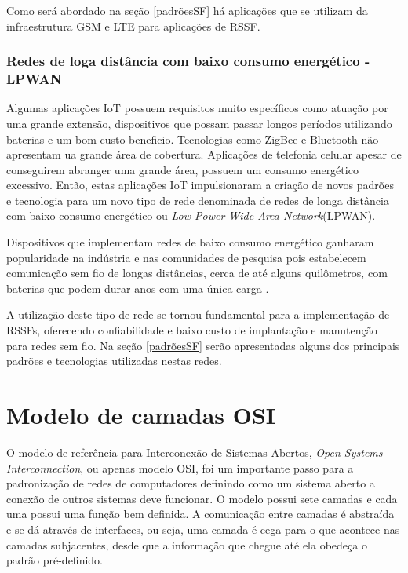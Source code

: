 Como será abordado na seção \ref{padrõesSF} há aplicações que se utilizam da infraestrutura GSM e LTE para aplicações de RSSF.


\subsubsection*{Redes de loga distância com baixo consumo energético - LPWAN}
Algumas aplicações IoT possuem requisitos muito específicos como atuação por uma grande extensão, dispositivos que possam passar longos períodos utilizando baterias e um bom custo beneficio. Tecnologias como ZigBee e Bluetooth não apresentam ua grande área de cobertura. Aplicações de telefonia celular apesar de conseguirem abranger uma grande área, possuem um consumo energético excessivo. Então, estas aplicações IoT impulsionaram a criação de novos padrões e tecnologia para um novo tipo de rede denominada de redes de longa distância com baixo consumo energético ou \emph{Low Power Wide Area Network}(LPWAN).

Dispositivos que implementam redes de baixo consumo energético ganharam popularidade na indústria e nas comunidades de pesquisa pois estabelecem comunicação sem fio de longas distâncias, cerca de até alguns quilômetros, com baterias que podem durar anos com uma única carga \cite{mekki2019comparative}.

A utilização deste tipo de rede se tornou fundamental para a implementação de RSSFs, oferecendo confiabilidade e baixo custo de implantação e manutenção para redes sem fio. Na seção \ref{padrõesSF} serão apresentadas alguns dos principais padrões e tecnologias utilizadas nestas redes.

\section{Modelo de camadas OSI}
\label{osi}
O modelo de referência para Interconexão de Sistemas Abertos, \emph{Open Systems Interconnection}, ou apenas modelo OSI, foi um importante passo para a padronização de redes de computadores definindo como um sistema aberto a conexão de outros sistemas deve funcionar. O modelo possui sete camadas e cada uma possui uma função bem definida. A comunicação entre camadas é abstraída e se dá através de interfaces, ou seja, uma camada é cega para o que acontece nas camadas subjacentes, desde que a informação que chegue até ela obedeça o padrão pré-definido.


